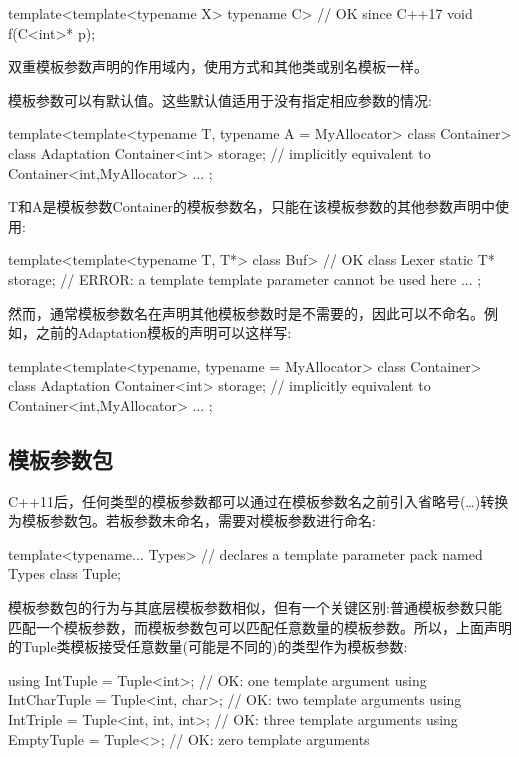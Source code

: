 \begin{cpp}
template<template<typename X> typename C> // OK since C++17
void f(C<int>* p);
\end{cpp}

双重模板参数声明的作用域内，使用方式和其他类或别名模板一样。

模板参数可以有默认值。这些默认值适用于没有指定相应参数的情况:

\begin{cpp}
template<template<typename T,
				  typename A = MyAllocator> class Container>
class Adaptation {
	Container<int> storage; // implicitly equivalent to Container<int,MyAllocator>
	...
};
\end{cpp}

T和A是模板参数Container的模板参数名，只能在该模板参数的其他参数声明中使用:

\begin{cpp}
template<template<typename T, T*> class Buf> // OK
class Lexer {
	static T* storage; // ERROR: a template template parameter cannot be used here
	...
};
\end{cpp}

然而，通常模板参数名在声明其他模板参数时是不需要的，因此可以不命名。例如，之前的Adaptation模板的声明可以这样写:

\begin{cpp}
template<template<typename,
				  typename = MyAllocator> class Container>
class Adaptation {
	Container<int> storage; // implicitly equivalent to Container<int,MyAllocator>
	...
};
\end{cpp}

\subsection{模板参数包}

C++11后，任何类型的模板参数都可以通过在模板参数名之前引入省略号(…)转换为模板参数包。若板参数未命名，需要对模板参数进行命名:

\begin{cpp}
template<typename... Types> // declares a template parameter pack named Types
class Tuple;
\end{cpp}

模板参数包的行为与其底层模板参数相似，但有一个关键区别:普通模板参数只能匹配一个模板参数，而模板参数包可以匹配任意数量的模板参数。所以，上面声明的Tuple类模板接受任意数量(可能是不同的)的类型作为模板参数:

\begin{cpp}
using IntTuple = Tuple<int>; // OK: one template argument
using IntCharTuple = Tuple<int, char>; // OK: two template arguments
using IntTriple = Tuple<int, int, int>; // OK: three template arguments
using EmptyTuple = Tuple<>; // OK: zero template arguments
\end{cpp}

